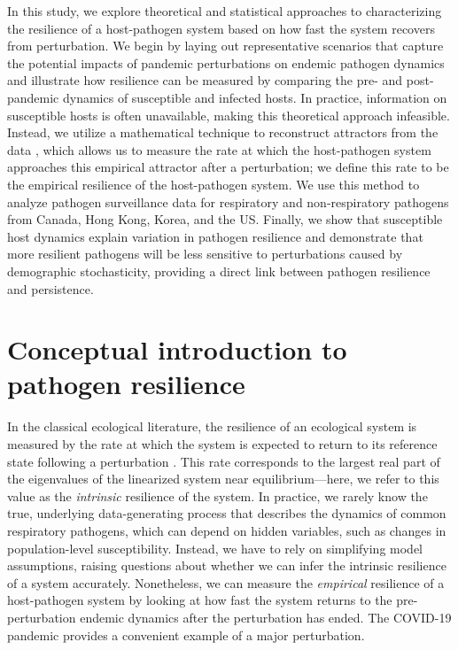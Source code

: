 \documentclass[12pt]{article}
\begin{document}
In this study, we explore theoretical and statistical approaches to characterizing the resilience of a host-pathogen system based on how fast the system recovers from perturbation.
We begin by laying out representative scenarios that capture the potential impacts of pandemic perturbations on endemic pathogen dynamics and illustrate how resilience can be measured by comparing the pre- and post-pandemic dynamics of susceptible and infected hosts.
In practice, information on susceptible hosts is often unavailable, making this theoretical approach infeasible.
Instead, we utilize a mathematical technique to reconstruct attractors from the data \citep{takens2006detecting}, which allows us to measure the rate at which the host-pathogen system approaches this empirical attractor after a perturbation;
we define this rate to be the empirical resilience of the host-pathogen system.
We use this method to analyze pathogen surveillance data for respiratory and non-respiratory pathogens from Canada, Hong Kong, Korea, and the US.
Finally, we show that susceptible host dynamics explain variation in pathogen resilience and demonstrate that more resilient pathogens will be less sensitive to perturbations caused by demographic stochasticity, providing a direct link between pathogen resilience and persistence. 
 
\section*{Conceptual introduction to pathogen resilience}

In the classical ecological literature, the resilience of an ecological system is measured by the rate at which the system is expected to return to its reference state following a perturbation \citep{pimm1979structure, neubert1997alternatives,gunderson2000ecological,dakos2022ecological}.
This rate corresponds to the largest real part of the eigenvalues of the linearized system near equilibrium---here, we refer to this value as the \emph{intrinsic} resilience of the system.
In practice, we rarely know the true, underlying data-generating process that describes the dynamics of common respiratory pathogens, which can depend on hidden variables, such as changes in population-level susceptibility.
Instead, we have to rely on simplifying model assumptions, raising questions about whether we can infer the intrinsic resilience of a system accurately.
Nonetheless, we can measure the \emph{empirical} resilience of a host-pathogen system by looking at how fast the system returns to the pre-perturbation endemic dynamics after the perturbation has ended.
The COVID-19 pandemic provides a convenient example of a major perturbation.
\end{document}
